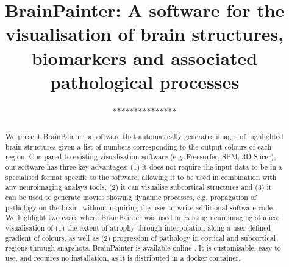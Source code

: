 \documentclass{llncs}
\begin{document}
\title{BrainPainter: A software for the visualisation of brain structures, biomarkers and associated pathological processes}
%
%


\author{***************}

\authorrunning{} %

\institute{***************}



\maketitle              %


\newcommand{\expFld}{.}


\begin{abstract}
We present BrainPainter, a software that automatically generates images of highlighted brain structures given a list of numbers corresponding to the output colours of each region. Compared to existing visualisation software (e.g. Freesurfer, SPM, 3D Slicer), our software has three key advantages: (1) it does not require the input data to be in a specialised format specific to the software, allowing it to be used in combination with any neuroimaging analsys tools, (2) it can visualise subcortical structures and (3) it can be used to generate movies showing dynamic processes, e.g. propagation of pathology on the brain, without requiring the user to write additional software code. We highlight two cases where BrainPainter was used in existing neuroimaging studies: visualisation of (1) the extent of atrophy through interpolation along a user-defined gradient of colours, as well as (2) progression of pathology in cortical and subcortical regions through snapshots. BrainPainter is available online \cite{brainPainter}. It is customisable, easy to use, and requires no installation, as it is distributed in a docker container.

\end{abstract}
\end{document}
